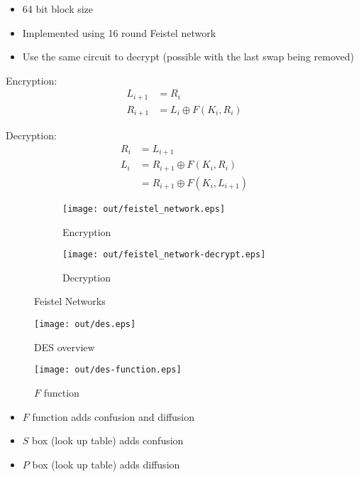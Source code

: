\documentclass[a4paper]{article}
\begin{document}
\begin{itemize}
  \item 64 bit block size
  \item Implemented using 16 round Feistel network
  \item Use the same circuit to decrypt (possible with the last swap being
        removed)
\end{itemize}

Encryption:
\begin{align*}
  L_{i+1} &= R_{i} \\
  R_{i+1} &= L_{i} \oplus F(K_{i}, R_{i})
\end{align*}

Decryption:
\begin{align*}
  R_{i} &= L_{i+1} \\
  L_{i} &= R_{i+1} \oplus F(K_{i}, R_{i}) \\
        &= R_{i+1} \oplus F(K_{i}, L_{i+1})
\end{align*}

\begin{figure}[h]
  \centering
  \begin{subfigure}[t!]{0.4\textwidth}
    \texttt{[image: out/feistel\_network.eps]}
    \caption{Encryption}
    \label{fig:feistel_network}
  \end{subfigure}
  \begin{subfigure}[t!]{0.4\textwidth}
    \texttt{[image: out/feistel\_network-decrypt.eps]}
    \caption{Decryption}
    \label{fig:feistel_network_decrypt}
  \end{subfigure}
  \caption{Feistel Networks}
  \label{fig:feistel_networks}
\end{figure}
\FloatBarrier

\begin{figure}[h!]
  \centering
  \texttt{[image: out/des.eps]}
  \caption{DES overview}
  \label{fig:des}
\end{figure}
\FloatBarrier

\begin{figure}[h!]
  \centering
  \texttt{[image: out/des-function.eps]}
  \caption{$F$ function}
  \label{fig:des-function}
\end{figure}
\FloatBarrier

\begin{itemize}
  \item $F$ function adds confusion and diffusion
  \item $S$ box (look up table) adds confusion
  \item $P$ box (look up table) adds diffusion
\end{itemize}
\end{document}
